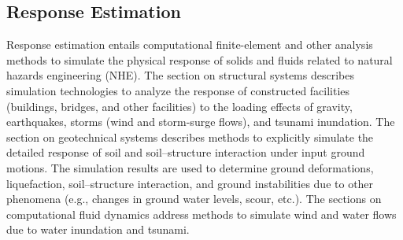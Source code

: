 
\begin{partbacktext}
\part{Response Estimation}
\label{part:response}

Response estimation entails computational finite-element and other analysis methods to simulate the physical response of solids and fluids related to natural hazards engineering (NHE). The section on structural systems describes simulation technologies to analyze the response of constructed facilities (buildings, bridges, and other facilities) to the loading effects of gravity, earthquakes, storms (wind and storm-surge flows), and tsunami inundation. The section on geotechnical systems describes methods to explicitly simulate the detailed response of soil and soil--structure interaction under input ground motions. The simulation results are used to determine ground deformations, liquefaction, soil--structure interaction, and ground instabilities due to other phenomena (e.g., changes in ground water levels, scour, etc.). The sections on computational fluid dynamics address methods to simulate wind and water flows due to water inundation and tsunami. 

\end{partbacktext}